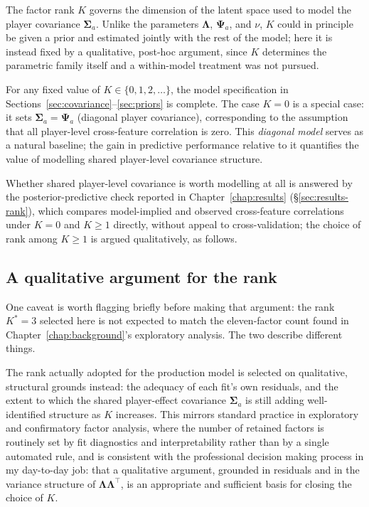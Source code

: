 The factor rank $K$ governs the dimension of the latent space used to model the player covariance $\boldsymbol{\Sigma}_a$. Unlike the parameters $\boldsymbol{\Lambda}$, $\boldsymbol{\Psi}_a$, and $\nu$, $K$ could in principle be given a prior and estimated jointly with the rest of the model; here it is instead fixed by a qualitative, post-hoc argument, since $K$ determines the parametric family itself and a within-model treatment was not pursued.

For any fixed value of $K \in \{0, 1, 2, \ldots\}$, the model specification in Sections~\ref{sec:covariance}--\ref{sec:priors} is complete. The case $K = 0$ is a special case: it sets $\boldsymbol{\Sigma}_a = \boldsymbol{\Psi}_a$ (diagonal player covariance), corresponding to the assumption that all player-level cross-feature correlation is zero. This \emph{diagonal model} serves as a natural baseline; the gain in predictive performance relative to it quantifies the value of modelling shared player-level covariance structure.

Whether shared player-level covariance is worth modelling at all is answered by the posterior-predictive check reported in Chapter~\ref{chap:results} (\S\ref{sec:results-rank}), which compares model-implied and observed cross-feature correlations under $K=0$ and $K\geq1$ directly, without appeal to cross-validation; the choice of rank among $K \geq 1$ is argued qualitatively, as follows.

\subsection{A qualitative argument for the rank}
\label{sec:rank_qualitative}

One caveat is worth flagging briefly before making that argument: the rank $K^*=3$ selected here is not expected to match the eleven-factor count found in Chapter~\ref{chap:background}'s exploratory analysis. The two describe different things.

The rank actually adopted for the production model is selected on qualitative, structural grounds instead: the adequacy of each fit's own residuals, and the extent to which the shared player-effect covariance $\boldsymbol{\Sigma}_a$ is still adding well-identified structure as $K$ increases. This mirrors standard practice in exploratory and confirmatory factor analysis, where the number of retained factors is routinely set by fit diagnostics and interpretability rather than by a single automated rule, and is consistent with the professional decision making process in my day-to-day job: that a qualitative argument, grounded in residuals and in the variance structure of $\boldsymbol{\Lambda}\boldsymbol{\Lambda}^\top$, is an appropriate and sufficient basis for closing the choice of $K$.

